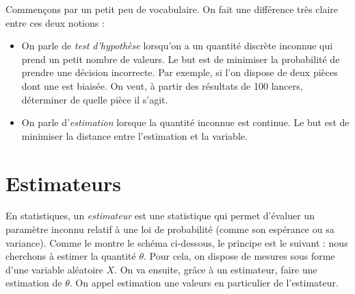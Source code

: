 \documentclass[a4paper,12pt]{report}
\theoremstyle{definition}
\renewcommand{\(}{\left(}
\renewcommand{\)}{\right)}
\renewcommand{\P}{\mathcal{P}}
\renewcommand{\d}{\textit}
\begin{document}
        Commençons par un petit peu de vocabulaire. On fait une différence très claire entre ces deux notions :
        \begin{itemize}[label=\textbullet]
            \item On parle de \d{test d'hypothèse} lorsqu'on a un quantité discrète inconnue qui prend un petit nombre de valeurs. Le but est de minimiser la probabilité de prendre une décision incorrecte. Par exemple, si l'on dispose de deux pièces dont une est biaisée. On veut, à partir des résultats de 100 lancers, déterminer de quelle pièce il s'agit.
            
            \item On parle d'\d{estimation} lorsque la quantité inconnue est continue. Le but est de minimiser la distance entre l'estimation et la variable.
        \end{itemize}
        
        \section{Estimateurs}
        
        En statistiques, un \d{estimateur} est une statistique qui permet d'évaluer un paramètre inconnu relatif à une loi de probabilité (comme son espérance ou sa variance). Comme le montre le schéma ci-dessous, le principe est le suivant : nous cherchons à estimer la quantité $\theta$. Pour cela, on dispose de mesures sous forme d'une variable aléatoire $X$. On va ensuite, grâce à un estimateur, faire une estimation de $\theta$. On appel estimation une valeurs en particulier de l'estimateur.
        
        \begin{figure}[H]
            \centering
            \caption{}
        \end{figure}
        
\end{document}
